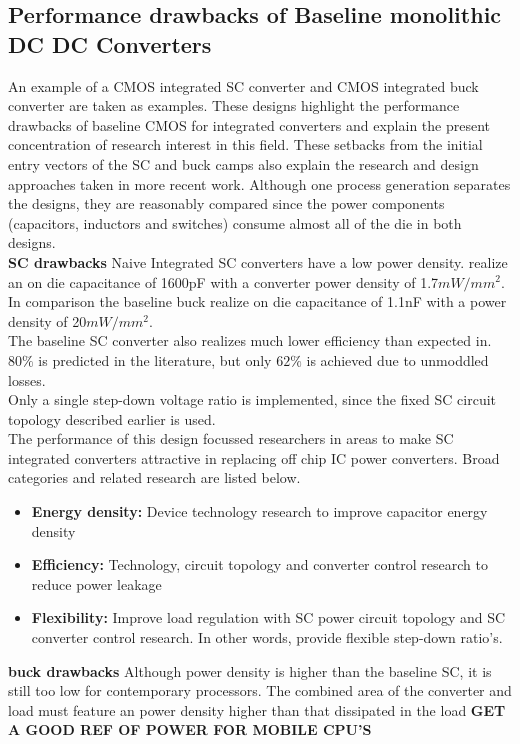 \documentclass[letterpaper,twocolumn,10pt]{article}
\begin{document}
\subsection{Performance drawbacks of Baseline monolithic DC DC Converters}
An example of a CMOS integrated SC converter \cite{Viraj2007} and CMOS integrated buck converter \cite{Alimadadi2008} are taken as examples. These designs highlight the performance drawbacks of baseline CMOS for integrated converters and explain the present concentration of research interest in this field. These setbacks from the initial entry vectors of the SC and buck camps also explain the research and design approaches taken in more recent work. Although one process generation separates the designs, they are reasonably compared since the power components (capacitors, inductors and switches) consume almost all of the die in both designs.\\
\textbf{SC drawbacks} Naive Integrated SC converters have a low power density. \cite{Viraj2007} realize an on die capacitance of 1600pF with a converter power density of 1.7$mW/mm^2$. In comparison  the baseline buck \cite{Alimadadi2008} realize on die capacitance of 1.1nF with a power density of 20$mW/mm^2$.\\
The baseline SC converter also realizes much lower efficiency than expected in\cite{Viraj2007}. $80\%$ is predicted in the literature, but only $62\%$ is achieved due to unmoddled losses.\\
Only a single step-down voltage ratio is implemented, since the fixed SC circuit topology described earlier is used.\\
The performance of this design focussed researchers in areas to make SC integrated converters attractive in replacing off chip IC power converters. Broad categories and related research are listed below.\\
\begin{itemize}
\item \textbf{Energy density: }Device technology research to improve capacitor energy density
\item \textbf{Efficiency: }Technology, circuit topology and converter control research to reduce power leakage
\item \textbf{Flexibility: }Improve load regulation with SC power circuit topology and SC converter control research. In other words, provide flexible step-down ratio's. 
\end{itemize}
\textbf{buck drawbacks} Although power density is higher than the baseline SC, it is still too low for contemporary processors. The combined area of the converter and load must feature an power density higher than that dissipated in the load \textbf{GET A GOOD REF OF POWER FOR MOBILE CPU'S}\\
\end{document}
